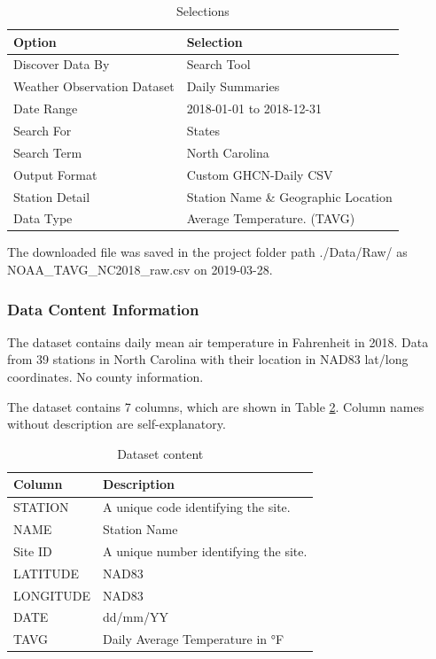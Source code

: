 \documentclass[12pt,]{article}
\begin{document}
\begin{table}[ht]
\centering
\begin{tabular}{ll}
  \hline
Option & Selection \\ 
  \hline
Discover Data By & Search Tool \\ 
  Weather Observation Dataset & Daily Summaries \\ 
  Date Range & 2018-01-01 to 2018-12-31 \\ 
  Search For & States \\ 
  Search Term & North Carolina \\ 
  Output Format & Custom GHCN-Daily CSV \\ 
  Station Detail & Station Name \& Geographic Location \\ 
  Data Type & Average Temperature. (TAVG) \\ 
   \hline
\end{tabular}
\caption{Selections} 
\label{tab:tab6}
\end{table}

The downloaded file was saved in the project folder path ./Data/Raw/ as
NOAA\_TAVG\_NC2018\_raw.csv on 2019-03-28.

\subsubsection{Data Content
Information}\label{data-content-information-2}

The dataset contains daily mean air temperature in Fahrenheit in 2018.
Data from 39 stations in North Carolina with their location in NAD83
lat/long coordinates. No county information.

The dataset contains 7 columns, which are shown in Table \ref{tab:tab7}.
Column names without description are self-explanatory.

\begin{table}[ht]
\centering
\begin{tabular}{p{2.5in}p{3.5in}}
  \hline
Column & Description \\ 
  \hline
STATION & A unique code identifying the site. \\ 
  NAME & Station Name \\ 
  Site ID & A unique number identifying the site. \\ 
  LATITUDE & NAD83 \\ 
  LONGITUDE & NAD83 \\ 
  DATE & dd/mm/YY \\ 
  TAVG & Daily Average Temperature in °F \\ 
   \hline
\end{tabular}
\caption{Dataset content} 
\label{tab:tab7}
\end{table}
\end{document}
